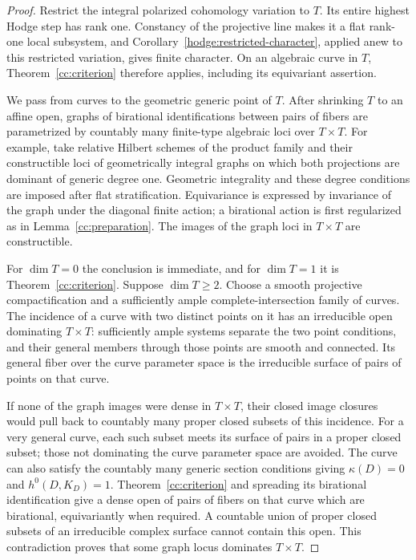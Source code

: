 \begin{proof}
Restrict the integral polarized cohomology variation to $T$.  Its
entire highest Hodge step has rank one.  Constancy of the projective
line makes it a flat rank-one local subsystem, and
Corollary~\ref{hodge:restricted-character}, applied anew to this
restricted variation, gives finite character.  On an algebraic curve
in $T$, Theorem~\ref{cc:criterion} therefore applies, including its
equivariant assertion.

We pass from curves to the geometric generic point of $T$.  After
shrinking $T$ to an affine open, graphs of birational identifications between pairs of
fibers are parametrized by countably many finite-type algebraic loci
over $T\times T$.  For example, take relative Hilbert schemes of the
product family and their constructible loci of geometrically integral
graphs on which both projections are dominant of generic degree one.
Geometric integrality and these degree conditions are imposed after
flat stratification.  Equivariance is
expressed by invariance of the graph under the diagonal finite action;
a birational action is first regularized as in
Lemma~\ref{cc:preparation}.  The images of the graph loci in
$T\times T$ are constructible.

For $\dim T=0$ the conclusion is immediate, and for $\dim T=1$ it is
Theorem~\ref{cc:criterion}.  Suppose $\dim T\ge2$.  Choose a smooth
projective compactification and a sufficiently ample complete-intersection
family of curves.  The incidence of a curve with two distinct points
on it has an irreducible open dominating $T\times T$: sufficiently
ample systems separate the two point conditions, and their general
members through those points are smooth and connected.  Its general
fiber over the curve parameter space is the irreducible surface of
pairs of points on that curve.

If none of the graph images were dense in $T\times T$, their closed
image closures would pull back to countably many proper closed subsets
of this incidence.  For a very general curve, each such subset meets
its surface of pairs in a proper closed subset; those not dominating
the curve parameter space are avoided.  The curve can also satisfy
the countably many generic section conditions giving $\kappa(D)=0$
and $h^0(D,K_D)=1$.  Theorem~\ref{cc:criterion} and spreading its
birational identification give a dense open of pairs of fibers on
that curve which are birational, equivariantly when required.  A
countable union of proper closed subsets of an irreducible complex
surface cannot contain this open.  This contradiction proves that
some graph locus dominates $T\times T$.


\end{proof}
